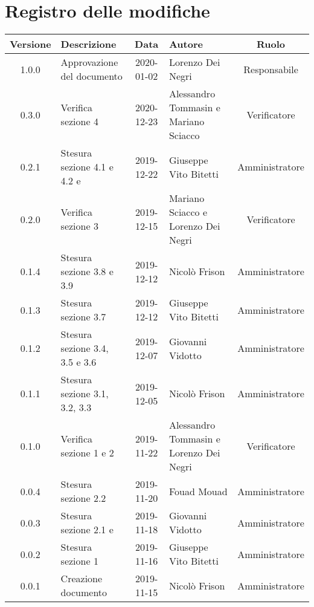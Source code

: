 \section*{Registro delle modifiche}

\begin{center}
	\begin{longtable}{|c|p{3cm}|c|p{4cm}|c|}
	\hline
	\rowcolor{lighter-grayer}
	\textbf{Versione} & \textbf{Descrizione} & \textbf{Data} & \textbf{Autore} & \textbf{Ruolo} \\
	\hline
	\endfirsthead



	\hline
	1.0.0 & Approvazione del documento & 2020-01-02 & Lorenzo Dei Negri & Responsabile \\
	\hline 
	0.3.0 & Verifica sezione 4 & 2020-12-23 & Alessandro Tommasin e Mariano Sciacco & Verificatore\\
	\hline
	0.2.1 & Stesura sezione 4.1 e 4.2 e & 2019-12-22 & Giuseppe Vito Bitetti & Amministratore \\
	\hline
	0.2.0 & Verifica sezione 3 & 2019-12-15 & Mariano Sciacco e Lorenzo Dei Negri & Verificatore \\
	\hline
	0.1.4 & Stesura sezione 3.8 e 3.9 & 2019-12-12 & Nicolò Frison & Amministratore \\
	\hline
	0.1.3 & Stesura sezione 3.7 & 2019-12-12 & Giuseppe Vito Bitetti & Amministratore \\
	\hline
	0.1.2 & Stesura sezione 3.4, 3.5 e 3.6 & 2019-12-07 & Giovanni Vidotto & Amministratore \\
	\hline
	0.1.1 & Stesura sezione 3.1, 3.2, 3.3  & 2019-12-05 & Nicolò Frison & Amministratore \\
	\hline
	0.1.0 & Verifica sezione 1 e 2 & 2019-11-22 & Alessandro Tommasin e Lorenzo Dei Negri & Verificatore \\
	\hline
	0.0.4 & Stesura sezione 2.2 & 2019-11-20 & Fouad Mouad & Amministratore \\
	\hline
	0.0.3 & Stesura sezione 2.1 e & 2019-11-18 & Giovanni Vidotto & Amministratore \\
	\hline
	0.0.2 & Stesura sezione 1 & 2019-11-16 & Giuseppe Vito Bitetti & Amministratore \\
	\hline
	0.0.1 & Creazione documento & 2019-11-15 & Nicolò Frison & Amministratore  \\
	\hline

	\end{longtable}
\end{center}
